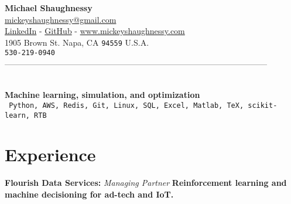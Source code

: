 \documentclass[11pt, a4paper]{article}
\newcommand{\years}[1]{\marginnote{\scriptsize #1}}
\begin{document}
{\LARGE \textbf{Michael Shaughnessy}}  \\[0.25cm]

{\color{hyperlinkcolor}\href{mailto:mickeyshaughnessy@gmail.com}{mickeyshaughnessy@gmail.com} \\ 
\href{https://www.linkedin.com/in/michaelshaughnessy1}{LinkedIn} - 
\href{https://github.com/mickeyshaughnessy}{GitHub} - 
\href{http://www.mickeyshaughnessy.com}{www.mickeyshaughnessy.com}}\\
1905 Brown St.
Napa, CA \texttt{94559}
U.S.A. \\%
\texttt{530-219-0940}\\


------------------------------------------------------------------------------------------------

 \\
    {\color{mycolor1}\textbf{Machine learning, simulation, and optimization}} \singlespace
{}\\
 \texttt{  Python,  AWS, Redis, Git, Linux, SQL, Excel, Matlab, TeX, scikit-learn, RTB}



\section*{\color{mycolor4}\textbf{Experience}}
\noindent
\years{Present}\textbf{Flourish Data Services:}
\emph{Managing Partner} \newline \vspace{0.5em}
\textbf{{\color{mycolor2}Reinforcement learning and machine decisioning for ad-tech and IoT.}}\\
\end{document}
